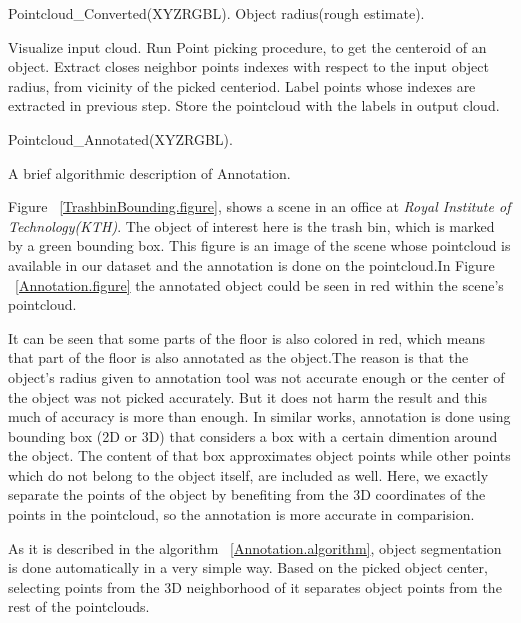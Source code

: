 \begin{algorithm}[t]
\begin{algorithmic}[1]
\REQUIRE Pointcloud\_Converted(XYZRGBL).
\REQUIRE Object radius(rough estimate).
\medskip

\STATE Visualize input cloud.
  \STATE Run Point picking procedure, to get the centeroid of an object.
  \STATE Extract closes neighbor points indexes with respect to the input object radius, from vicinity of the picked centeriod.
  \STATE Label points whose indexes are extracted in previous step.
\ENDFOR
\STATE Store the pointcloud with the labels in output cloud.

\medskip
\ENSURE Pointcloud\_Annotated(XYZRGBL).
\end{algorithmic}
\caption[Annotation.]
{A brief algorithmic description of Annotation.}
\label{Annotation.algorithm}
\end{algorithm}


Figure ~\ref{TrashbinBounding.figure}, shows a scene in an office at {\it Royal Institute of Technology(KTH)}. The object of interest here is the trash bin, which is marked by a green bounding box. This figure is an image of the scene whose pointcloud is available in our dataset and the annotation is done on the pointcloud.In Figure ~\ref{Annotation.figure} the annotated object could be seen in red within the scene's pointcloud.


It can be seen that some parts of the floor is also colored in red, which means that part of the floor is also annotated as the object.The reason is that the object's radius given to annotation tool was not accurate enough or the center of the object was not picked accurately. But it does not harm the result and this much of accuracy is more than enough. In similar works, annotation is done using bounding box (2D or 3D) that considers a box with a certain dimention around the object. The content of that box approximates object points while other points which do not belong to the object itself, are included as well. Here, we exactly separate the points of the object by benefiting from the 3D coordinates of the points in the 
pointcloud, so the annotation is more accurate in comparision.


As it is described in the algorithm ~\ref{Annotation.algorithm}, object segmentation is done automatically in a very 
simple way. Based on the picked object center, selecting points from the 3D neighborhood of it separates object points from the 
rest of the pointclouds.

